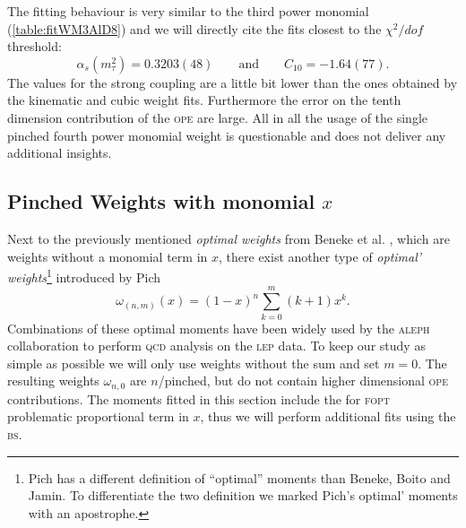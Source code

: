 \documentclass[../../index.tex]{subfiles}
\begin{document}
The fitting behaviour is very similar to the third power monomial
(\cref{table:fitWM3AlD8}) and we will directly cite the fits closest to the
\(\chi^2/dof\) threshold:
\begin{equation}
  \alpha_s(m_\tau^2) = 0.3203(48) \qquad \text{and} \qquad C_{10}=-1.64(77).
\end{equation}
The values for the strong coupling are a little bit lower than the ones obtained by
the kinematic and cubic weight fits. Furthermore the error on the tenth
dimension contribution of the \textsc{ope} are large. All in all the usage of
the single pinched fourth power monomial weight is questionable and does not
deliver any additional insights.


\subsection{Pinched Weights with monomial \(x\)}
Next to the previously mentioned \textit{optimal weights} from Beneke et al.
\cite{Beneke2012}, which are weights without a monomial term in \(x\), there
exist another type of \textit{optimal' weights}\footnote{Pich has a different
  definition of ``optimal'' moments than Beneke, Boito and Jamin. To
  differentiate the two definition we marked Pich's optimal' moments with an
  apostrophe.} introduced by Pich \cite{LeDiberder1992}
\begin{equation}
  \omega_{(n,m)}(x) = (1-x)^n\sum_{k=0}^m (k+1)x^k.
\end{equation}
Combinations of these optimal moments have been widely used by the
\textsc{aleph} collaboration to perform \textsc{qcd} analysis on the
\textsc{lep} data. To keep our study as simple as possible we will only use
weights without the sum and set \(m=0\). The resulting weights \(\omega_{n,0}\)
are \(n\)\-/pinched, but do not contain higher dimensional \textsc{ope}
contributions. The moments fitted in this section include the for \textsc{fopt}
problematic proportional term in \(x\), thus we will perform additional fits
using the \textsc{bs}.
\end{document}
